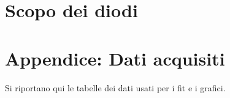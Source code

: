 \documentclass[10pt,a4paper]{article}
\begin{document}
\section{Scopo dei diodi}

\pagebreak
\section{Appendice: Dati acquisiti}
Si riportano qui le tabelle dei dati usati per i fit e i grafici.
\centering
\begin{figure}[H]
	\centering
	\resizebox{0.7\textwidth}{!}{
	}
	\label{tab:loop}
\end{figure}
\end{document}
